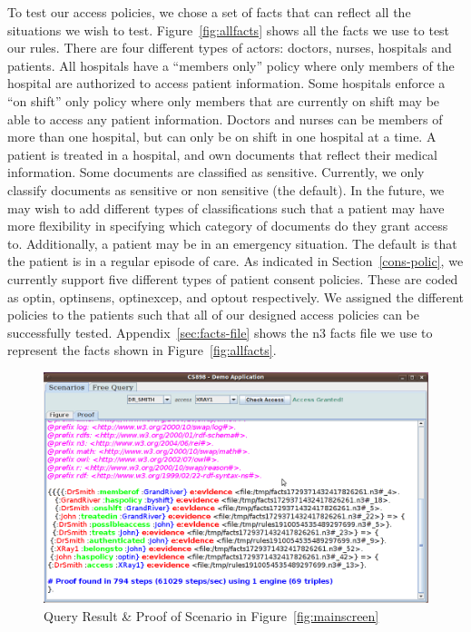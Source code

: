 \documentclass[conference]{IEEEtran}
\begin{document}
To test our access policies, we chose a set of facts that can reflect all the situations we wish to test. Figure~\ref{fig:allfacts} shows all the facts we use
to test our rules. There are four different types of actors: doctors, nurses, hospitals and patients. All hospitals have a ``members only'' policy where only
members of the hospital are authorized to access patient information. Some hospitals enforce a ``on shift'' only policy where only members that are currently on
shift may be able to access any patient information. Doctors and nurses can be members of more than one hospital, but can only be on shift in one hospital at a
time. A patient is treated in a hospital, and own documents that reflect their medical information. Some documents are classified as sensitive. Currently, we
only classify documents as sensitive or non sensitive (the default). In the future, we may wish to add different types of classifications such that a patient
may have more flexibility in specifying which category of documents do they grant access to. Additionally, a patient may be in an emergency situation. The
default is that the patient is in a regular episode of care. As indicated in Section~\ref{cons-polic}, we currently support five different types of patient
consent policies. These are coded as optin, optinsens, optinexcep, and optout respectively. We assigned the different policies to the patients such that all of
our designed access policies can be successfully tested. 
Appendix~\ref{sec:facts-file} shows the n3 facts file we use to represent the facts shown in Figure~\ref{fig:allfacts}.

\begin{figure}[!t]
 \centering
 \includegraphics[scale=0.25,keepaspectratio=true]{./proof.png}
 \caption{Query Result \& Proof of Scenario in Figure~\ref{fig:mainscreen}}
 \label{fig:proof}
\end{figure}
\end{document}
